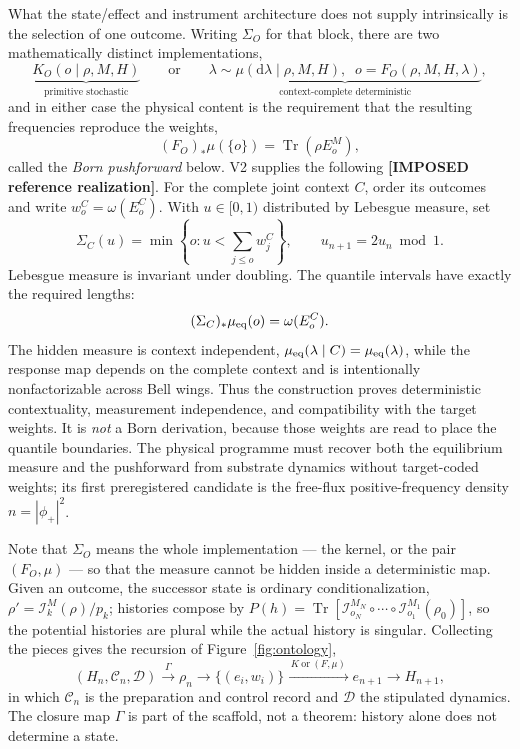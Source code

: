 \documentclass[11pt,a4paper]{article}
\newcommand{\Tr}{\operatorname{Tr}}
\newcommand{\dd}{\mathrm{d}}
\theoremstyle{definition}
\theoremstyle{plain}
\theoremstyle{remark}
\begin{document}
What the state/effect and instrument architecture does not supply
intrinsically is the selection of one outcome. Writing
$\Sigma_O$ for that block, there are two mathematically distinct
implementations,
\[
\underbrace{K_O(o\mid\rho,M,H)}_{\text{primitive stochastic}}
\qquad\text{or}\qquad
\underbrace{\lambda\sim\mu(\dd\lambda\mid\rho,M,H),\;\;
o = F_O(\rho,M,H,\lambda)}_{\text{context-complete deterministic}},
\]
and in either case the physical content is the requirement that the
resulting frequencies reproduce the weights,
\begin{equation}
(F_O)_*\mu(\{o\}) = \Tr(\rho E^M_o) ,
\label{eq:pushforward}
\end{equation}
called the \emph{Born pushforward} below. V2 supplies the following
\textbf{[IMPOSED reference realization]}. For the complete joint context
$C$, order its outcomes and write $w_o^C=\omega(E_o^C)$. With
$u\in[0,1)$ distributed by Lebesgue measure, set
\begin{equation}
 \Sigma_C(u)=\min\left\{o:
 u<\sum_{j\le o}w_j^C\right\},
 \qquad u_{n+1}=2u_n\bmod1 .
 \label{eq:quantileselector}
\end{equation}
Lebesgue measure is invariant under doubling. The quantile intervals have
exactly the required lengths:
\begin{equation}
 (\Sigma_C)_*\mu_{\rm eq}(o)=\omega(E_o^C).
\end{equation}
The hidden measure is context independent,
$\mu_{\rm eq}(\lambda\mid C)=\mu_{\rm eq}(\lambda)$, while the response map
depends on the complete context and is intentionally nonfactorizable across
Bell wings. Thus the construction proves deterministic contextuality,
measurement independence, and compatibility with the target weights. It is
\emph{not} a Born derivation, because those weights are read to place the
quantile boundaries. The physical programme must recover both the equilibrium
measure and the pushforward from substrate dynamics without target-coded
weights; its first preregistered candidate is the free-flux positive-frequency
density $n=|\phi_+|^2$.

Note that $\Sigma_O$ means the
whole implementation --- the kernel, or the pair $(F_O,\mu)$ --- so that
the measure cannot be hidden inside a deterministic map. Given an
outcome, the successor state is ordinary conditionalization,
$\rho' = \mathcal{I}^M_k(\rho)/p_k$; histories compose by
$P(h) = \Tr[\mathcal{I}^{M_N}_{o_N}\circ\cdots\circ\mathcal{I}^{M_1}_{o_1}(\rho_0)]$,
so the potential histories are plural while the actual history is
singular. Collecting the pieces gives the recursion of
Figure~\ref{fig:ontology},
\begin{equation}
(H_n,\mathcal{C}_n,\mathcal{D}) \xrightarrow{\;\Gamma\;} \rho_n
\longrightarrow \{(e_i,w_i)\}
\xrightarrow{\;K\ \text{or}\ (F,\mu)\;} e_{n+1} \longrightarrow H_{n+1},
\label{eq:recursion}
\end{equation}
in which $\mathcal{C}_n$ is the preparation and control record and
$\mathcal{D}$ the stipulated dynamics. The closure map $\Gamma$ is part
of the scaffold, not a theorem: history alone does not determine a state.
\end{document}

